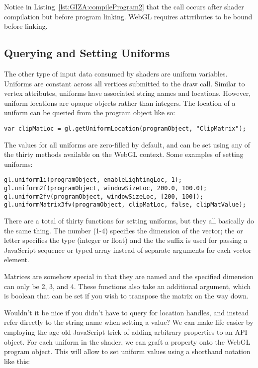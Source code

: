 \begin{sidenote}%
Notice in Listing~\ref{lst:GIZA:compileProgram2} that the  call occurs after shader compilation but before program linking.  WebGL requires attrributes to be bound before linking.
\end{sidenote}%

\subsection{Querying and Setting Uniforms}

The other type of input data consumed by shaders are uniform variables.  Uniforms are constant across all vertices submitted to the draw call.  Similar to vertex attributes, uniforms have associated string names and locations.  However, uniform locations are opaque objects rather than integers.  The location of a uniform can be queried from the program object like so:

\begin{lstlisting}
var clipMatLoc = gl.getUniformLocation(programObject, "ClipMatrix");
\end{lstlisting}

The values for all uniforms are zero-filled by default, and can be set using any of the thirty  methods available on the WebGL context.  Some examples of setting uniforms:

\begin{lstlisting}
gl.uniform1i(programObject, enableLightingLoc, 1);
gl.uniform2f(programObject, windowSizeLoc, 200.0, 100.0);
gl.uniform2fv(programObject, windowSizeLoc, [200, 100]);
gl.uniformMatrix3fv(programObject, clipMatLoc, false, clipMatValue);
\end{lstlisting}

There are a total of thirty functions for setting uniforms, but they all basically do the same thing.  The number (1-4) specifies the dimension of the vector; the  or  letter specifies the type (integer or float) and the the  suffix is used for passing a JavaScript sequence or typed array instead of separate arguments for each vector element.

Matrices are somehow special in that they are named  and the specified dimension can only be 2, 3, and 4.  These functions also take an additional argument, which is boolean that can be set if you wish to transpose the matrix on the way down.

Wouldn't it be nice if you didn't have to query for location handles, and instead refer directly to the string name when setting a value?  We can make life easier by employing the age-old JavaScript trick of adding arbitrary properties to an API object.  For each uniform in the shader, we can graft a property onto the WebGL program object.  This will allow to set uniform values using a shorthand notation like this:

